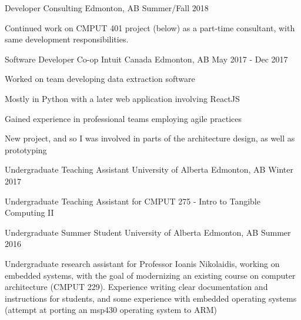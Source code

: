 
\begin{cventries}
  \cventry
    {Developer} %
    {Consulting} %
    {Edmonton, AB} %
    {Summer/Fall 2018} %
    {
      \begin{cvitems} %
      \item {Continued work on CMPUT 401 project (below) as a part-time consultant, with same development responsibilities.}
      \end{cvitems}
    }

  \cventry
    {Software Developer Co-op} %
    {Intuit Canada} %
    {Edmonton, AB} %
    {May 2017 - Dec 2017} %
    {
      \begin{cvitems} %
      \item {Worked on team developing data extraction software}
      \item {Mostly in Python with a later web application involving ReactJS}
      \item {Gained experience in professional teams employing agile practices}
      \item {New project, and so I was involved in parts of the architecture design, as well as prototyping}
      \end{cvitems}
    }

  \cventry
    {Undergraduate Teaching Assistant} %
    {University of Alberta} %
    {Edmonton, AB} %
    {Winter 2017} %
    {
      \begin{cvitems} %
      \item {Undergraduate Teaching Assistant for CMPUT 275 - Intro to Tangible Computing II}
      \end{cvitems}
    }

  \cventry
    {Undergraduate Summer Student} %
    {University of Alberta} %
    {Edmonton, AB} %
    {Summer 2016} %
    {
      \begin{cvitems} %
      \item {Undergraduate research assistant for Professor Ioanis Nikolaidis, working on embedded systems, with the goal of modernizing an existing course on computer architecture (CMPUT 229). Experience writing clear documentation and instructions for students, and some experience with embedded operating systems (attempt at porting an msp430 operating system to ARM)}
      \end{cvitems}
    }


\end{cventries}
